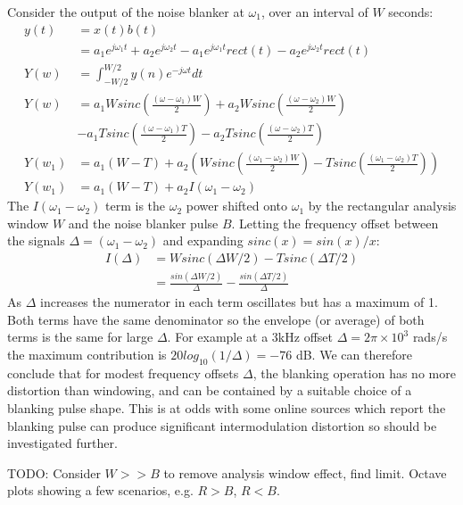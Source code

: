 \documentclass{article}
\begin{document}
Consider the output of the noise blanker at $\omega_1$, over an interval of $W$ seconds:
\begin{equation}
\begin{split}
y(t) &= x(t)b(t) \\
     &= a_1 e^{j \omega_1 t} + a_2 e^{j \omega_2 t} - a_1 e^{j \omega_1 t}rect(t) - a_2 e^{j \omega_2 t}rect(t) \\
Y(w) &= \int_{-W/2}^{W/2} y(n) e^{-j \omega t} dt \\    
Y(w) &= a_1 W sinc \left( \frac{(\omega-\omega_1)W}{2} \right) + a_2 W sinc \left( \frac{(\omega-\omega_2)W}{2}  \right)\\
     &- a_1 T sinc \left( \frac{(\omega-\omega_1)T}{2} \right) - a_2 T sinc \left( \frac{(\omega-\omega_2)T}{2} \right) \\
Y(w_1) &= a_1(W-T) + a_2 \left( W sinc \left( \frac{(\omega_1-\omega_2)W}{2} \right) - T sinc \left( \frac{(\omega_1-\omega_2)T}{2} \right) \right) \\
Y(w_1) &= a_1(W-T) + a_2 I(\omega_1-\omega_2)
\end{split}
\end{equation} 
The $I(\omega_1-\omega_2)$ term is the $\omega_2$ power shifted onto $\omega_1$ by the rectangular analysis window $W$ and the noise blanker pulse $B$.  Letting the frequency offset between the signals $\Delta = (\omega_1-\omega_2)$ and expanding $sinc(x) = sin(x)/x$:
\begin{equation}
\begin{split}
I(\Delta) &= W sinc (\Delta W/2) - T sinc (\Delta T/2) \\
&= \frac{sin (\Delta W/2)}{\Delta} - \frac{sin (\Delta T/2)}{\Delta}
\end{split}
\end{equation} 
As $\Delta$ increases the numerator in each term oscillates but has a maximum of 1.  Both terms have the same denominator so the envelope (or average) of both terms is the same for large $\Delta$.  For example at a 3kHz offset $\Delta = 2 \pi \times 10^3 $ rads/s the maximum contribution is $20log_{10}(1/\Delta) = -76$ dB. We can therefore conclude that for modest frequency offsets $\Delta$, the blanking operation has no more distortion than windowing, and can be contained by a suitable choice of a blanking pulse shape. This is at odds with some online sources which report the blanking pulse can produce significant intermodulation distortion so should be investigated further.

TODO: Consider $W>>B$ to remove analysis window effect, find limit. Octave plots showing a few scenarios, e.g. $R>B$, $R<B$.



\end{document}
